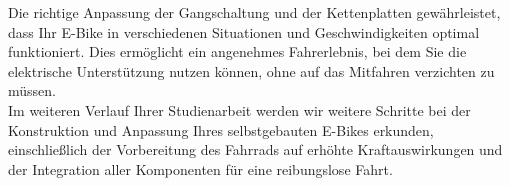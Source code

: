Die richtige Anpassung der Gangschaltung und der Kettenplatten gewährleistet, dass Ihr E-Bike in verschiedenen Situationen und Geschwindigkeiten optimal funktioniert. Dies ermöglicht ein angenehmes Fahrerlebnis, bei dem Sie die elektrische Unterstützung nutzen können, ohne auf das Mitfahren verzichten zu müssen.\\

Im weiteren Verlauf Ihrer Studienarbeit werden wir weitere Schritte bei der Konstruktion und Anpassung Ihres selbstgebauten E-Bikes erkunden, einschließlich der Vorbereitung des Fahrrads auf erhöhte Kraftauswirkungen und der Integration aller Komponenten für eine reibungslose Fahrt.\\
